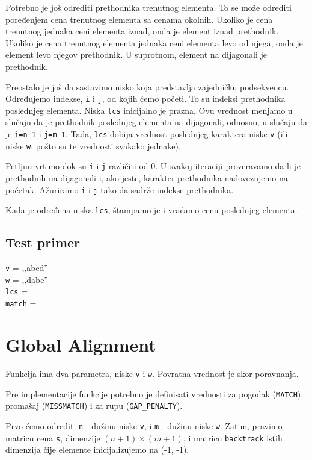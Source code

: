 Potrebno je još odrediti prethodnika trenutnog elementa. To se može odrediti poređenjem cena trenutnog elementa sa cenama okolnih. Ukoliko je cena trenutnog jednaka ceni elementa iznad, onda je element iznad prethodnik. Ukoliko je cena trenutnog elementa jednaka ceni elementa levo od njega, onda je element levo njegov prethodnik. U suprotnom, element na dijagonali je prethodnik.

Preostalo je još da sastavimo nisko koja predstavlja zajedničku podsekvencu. Određujemo indekse, \texttt{i} i \texttt{j}, od kojih ćemo početi. To su indeksi prethodnika poslednjeg elementa. Niska \texttt{lcs} inicijalno je prazna. Ovu vrednost menjamo u slučaju da je prethodnik poslednjeg elementa na dijagonali, odnosno, u slučaju da je \texttt{i=n-1} i \texttt{j=m-1}. Tada, \texttt{lcs} dobija vrednost poslednjeg karaktera niske \texttt{v} (ili niske \texttt{w}, pošto su te vrednosti svakako jednake).

Petljuu vrtimo dok su \texttt{i} i \texttt{j} različiti od 0. U svakoj iteraciji proveravamo da li je prethodnih na dijagonali i, ako jeste, karakter prethodnika nadovezujemo na početak. Ažuriramo \texttt{i} i \texttt{j} tako da sadrže indekse prethodnika.

Kada je određena niska \texttt{lcs}, štampamo je i vraćamo cenu poslednjeg elementa.




\subsection{Test primer}

\noindent\texttt{v} = ‚‚abcd''
\\\texttt{w} = ‚‚dabe''
\\\texttt{lcs} = 
\\\texttt{match} = 

\section{Global Alignment}

Funkcija ima dva parametra, niske \texttt{v} i \texttt{w}. Povratna vrednost je skor poravnanja.

Pre implementacije funkcije potrebno je definisati vrednosti za pogodak (\texttt{MATCH}), promašaj (\texttt{MISSMATCH}) i za rupu (\texttt{GAP\_PENALTY}).

Prvo ćemo odrediti \texttt{n} - dužinu niske \texttt{v}, i \texttt{m} - dužinu niske \texttt{w}. Zatim, pravimo matricu cena \texttt{s}, dimenzije $(n+1) \times (m+1)$, i matricu \texttt{backtrack} istih dimenzija čije elemente inicijalizujemo na (-1, -1). 

